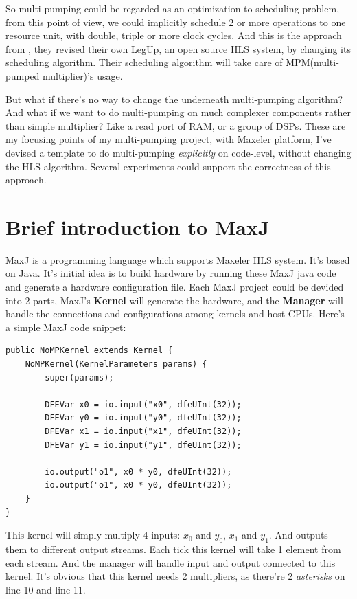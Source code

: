 \documentclass[a4paper, 10pt]{report}
\begin{document}
So multi-pumping could be regarded as an optimization to scheduling problem, from this point of view, we could implicitly schedule 2 or more operations to one resource unit, with double, triple or more clock cycles. And this is the approach from \cite{Canis:2013}, they revised their own LegUp, an open source HLS system, by changing its scheduling algorithm. Their scheduling algorithm will take care of MPM(multi-pumped multiplier)'s usage.

But what if there's no way to change the underneath multi-pumping algorithm? And what if we want to do multi-pumping on much complexer components rather than simple multiplier? Like a read port of RAM, or a group of DSPs. These are my focusing points of my multi-pumping project, with Maxeler platform, I've devised a template to do multi-pumping \textit{explicitly} on code-level, without changing the HLS algorithm. Several experiments could support the correctness of this approach.
 
\section{Brief introduction to MaxJ}
MaxJ is a programming language which supports Maxeler HLS system. It's based on Java. It's initial idea is to build hardware by running these MaxJ java code and generate a hardware configuration file. Each MaxJ project could be devided into 2 parts, MaxJ's \textbf{Kernel} will generate the hardware, and the \textbf{Manager} will handle the connections and configurations among kernels and host CPUs. Here's a simple MaxJ code snippet:

\begin{lstlisting}[caption=Non multi-pumped kernel example,float]
public NoMPKernel extends Kernel {
	NoMPKernel(KernelParameters params) {
		super(params);
		
		DFEVar x0 = io.input("x0", dfeUInt(32));
		DFEVar y0 = io.input("y0", dfeUInt(32));
		DFEVar x1 = io.input("x1", dfeUInt(32));
		DFEVar y1 = io.input("y1", dfeUInt(32));
		
		io.output("o1", x0 * y0, dfeUInt(32));
		io.output("o1", x0 * y0, dfeUInt(32));
	}
}
\end{lstlisting}

This kernel will simply multiply 4 inputs: $x_0$ and $y_0$, $x_1$ and $y_1$. And outputs them to different output streams. Each tick this kernel will take 1 element from each stream. And the manager will handle input and output connected to this kernel. It's obvious that this kernel needs 2 multipliers, as there're 2 \textit{asterisks} on line 10 and line 11.
\end{document}
